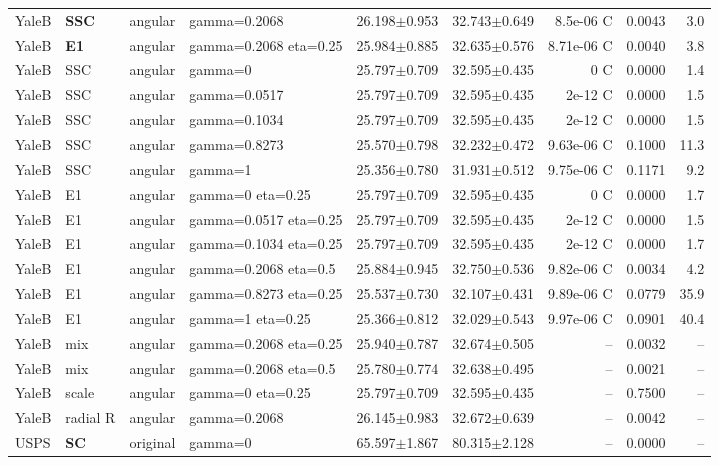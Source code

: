 \begin{longtable}{lllp{.14\linewidth}rrrrr}
YaleB & \textbf{SSC} & angular & gamma=0.2068 & 26.198$\pm$0.953 & 32.743$\pm$0.649 & 8.5e-06 C & 0.0043 & 3.0\\
YaleB & \textbf{E1} & angular & gamma=0.2068 eta=0.25 & 25.984$\pm$0.885 & 32.635$\pm$0.576 & 8.71e-06 C & 0.0040 & 3.8\\
YaleB & SSC & angular & gamma=0 & 25.797$\pm$0.709 & 32.595$\pm$0.435 & 0 C & 0.0000 & 1.4\\
YaleB & SSC & angular & gamma=0.0517 & 25.797$\pm$0.709 & 32.595$\pm$0.435 & 2e-12 C & 0.0000 & 1.5\\
YaleB & SSC & angular & gamma=0.1034 & 25.797$\pm$0.709 & 32.595$\pm$0.435 & 2e-12 C & 0.0000 & 1.5\\
YaleB & SSC & angular & gamma=0.8273 & 25.570$\pm$0.798 & 32.232$\pm$0.472 & 9.63e-06 C & 0.1000 & 11.3\\
YaleB & SSC & angular & gamma=1 & 25.356$\pm$0.780 & 31.931$\pm$0.512 & 9.75e-06 C & 0.1171 & 9.2\\
YaleB & E1 & angular & gamma=0 eta=0.25 & 25.797$\pm$0.709 & 32.595$\pm$0.435 & 0 C & 0.0000 & 1.7\\
YaleB & E1 & angular & gamma=0.0517 eta=0.25 & 25.797$\pm$0.709 & 32.595$\pm$0.435 & 2e-12 C & 0.0000 & 1.5\\
YaleB & E1 & angular & gamma=0.1034 eta=0.25 & 25.797$\pm$0.709 & 32.595$\pm$0.435 & 2e-12 C & 0.0000 & 1.7\\
YaleB & E1 & angular & gamma=0.2068 eta=0.5 & 25.884$\pm$0.945 & 32.750$\pm$0.536 & 9.82e-06 C & 0.0034 & 4.2\\
YaleB & E1 & angular & gamma=0.8273 eta=0.25 & 25.537$\pm$0.730 & 32.107$\pm$0.431 & 9.89e-06 C & 0.0779 & 35.9\\
YaleB & E1 & angular & gamma=1 eta=0.25 & 25.366$\pm$0.812 & 32.029$\pm$0.543 & 9.97e-06 C & 0.0901 & 40.4\\
YaleB & mix & angular & gamma=0.2068 eta=0.25 & 25.940$\pm$0.787 & 32.674$\pm$0.505 & -- & 0.0032 & --\\
YaleB & mix & angular & gamma=0.2068 eta=0.5 & 25.780$\pm$0.774 & 32.638$\pm$0.495 & -- & 0.0021 & --\\
YaleB & scale & angular & gamma=0 eta=0.25 & 25.797$\pm$0.709 & 32.595$\pm$0.435 & -- & 0.7500 & --\\
YaleB & radial R & angular & gamma=0.2068 & 26.145$\pm$0.983 & 32.672$\pm$0.639 & -- & 0.0042 & --\\
USPS & \textbf{SC} & original & gamma=0 & 65.597$\pm$1.867 & 80.315$\pm$2.128 & -- & 0.0000 & --\\

\end{longtable}
